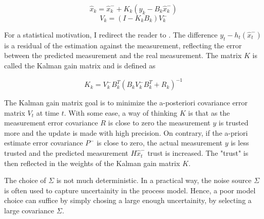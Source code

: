 \documentclass[mscthesis]{usiinfthesis}
\begin{document}
\[
\hat{x}_k = \hat{x}_k^- + K_k (y_k - B_k \hat{x}_k^-)
\]
\[
V_k = (I-K_k B_k)V_k^-
\]



For a statistical motivation, I redirect the reader to \citet{paper:Maybeck79}. The difference $y_t - h_t(\hat{x}_t^-)$ is a residual of the estimation against the measurement, reflecting the error between the predicted measurement and the real measurement. The matrix $K$ is called the Kalman gain matrix and is defined as 


\[
K_k = V_k^- B^T_k (B_k V_k^- B^T_k + R_k)^{-1}
\]




The Kalman gain matrix goal is to minimize the a-posteriori covariance error matrix $V_t$ at time $t$. With some ease, a way of thinking $K$ is that as the measurement error covariance $R$ is close to zero the measurement $y$ is trusted more and the update is made with high precision. On contrary, if the a-priori estimate error covariance $P^-$ is close to zero, the actual measurement $y$ is less trusted and the predicted measurement $H\hat{x}_t^-$ trust is increased. The "trust" is then reflected in the weights of the Kalman gain matrix $K$.



The choice of $\Sigma$ is not much deterministic. In a practical way, the noise source $\Sigma$ is often used to capture uncertainity in the process model. Hence, a poor model choice can suffice by simply chosing a large enough uncertainity, by selecting a large covariance $\Sigma$. 


\end{document}
